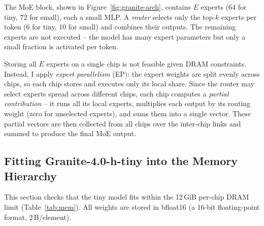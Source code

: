 The MoE block, shown in Figure~\ref{fig:granite-arch}, contains $E$ experts (64 for tiny, 72 for small), each a small MLP. A \emph{router} selects only the top-$k$ experts per token (6 for tiny, 10 for small) and combines their outputs. The remaining experts are not executed -- the model has many expert parameters but only a small fraction is activated per token.

Storing all $E$ experts on a single chip is not feasible given DRAM constraints. Instead, I apply \emph{expert parallelism} (EP): the expert weights are split evenly across chips, so each chip stores and executes only its local share. Since the router may select experts spread across different chips, each chip computes a \emph{partial contribution} -- it runs all its local experts, multiplies each output by its routing weight (zero for unselected experts), and sums them into a single vector. These partial vectors are then collected from all chips over the inter-chip links and summed to produce the final MoE output.

\subsection{Fitting Granite-4.0-h-tiny into the Memory Hierarchy}
\label{sec:mem-fit}

This section checks that the tiny model fits within the 12\,GiB per-chip DRAM limit (Table~\ref{tab:mem}). All weights are stored in bfloat16 (a 16-bit floating-point format, 2\,B/element).

